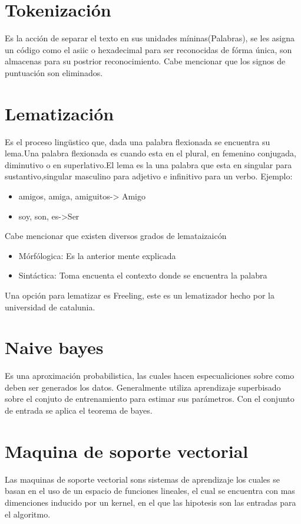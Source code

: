\section{Tokenización}
	Es la acción de separar el texto en sus unidades míninas(Palabras), se les asigna un código como 
	el asiic o hexadecimal para ser reconocidas de fórma única, son almacenas para su postrior reconocimiento.
	Cabe mencionar que los signos de puntuación son eliminados.

\section{Lematización}
	Es el proceso lingüstico que, dada una palabra flexionada 
	se encuentra su lema.Una palabra flexionada es cuando esta en el plural, en femenino conjugada, diminutivo o en superlativo.El lema es la una palabra que esta en singular para sustantivo,singular masculino para adjetivo e infinitivo para un verbo.
	Ejemplo:
	
	\begin{itemize}
		\item amigos, amiga, amiguitos-> Amigo
		\item soy, son, es->Ser
	\end{itemize}

	Cabe mencionar que existen diversos grados de lemataizaicón 

	\begin{itemize}
		\item Mórfólogica: Es la anterior mente explicada
		\item Sintáctica: Toma encuenta el contexto donde se encuentra la palabra
	\end{itemize}

	Una opción para lematizar es Freeling, este es un lematizador
	hecho por la universidad de catalunia.


\section{Naive bayes}
	Es una aproximación probabilistica, las cuales hacen especualiciones sobre como deben ser 
	generados los datos. Generalmente utiliza aprendizaje superbisado sobre el conjuto
	de entrenamiento para estimar sus parámetros. Con el conjunto de entrada 
	se aplica el teorema de bayes.

\section{Maquina de soporte vectorial}
	Las maquinas de soporte vectorial sons sistemas de aprendizaje los cuales se basan en el 
	uso de un espacio de funciones lineales, el cual se encuentra con mas dimenciones inducido 
	por un kernel, en el que las hipotesis son las entradas para el algoritmo.

